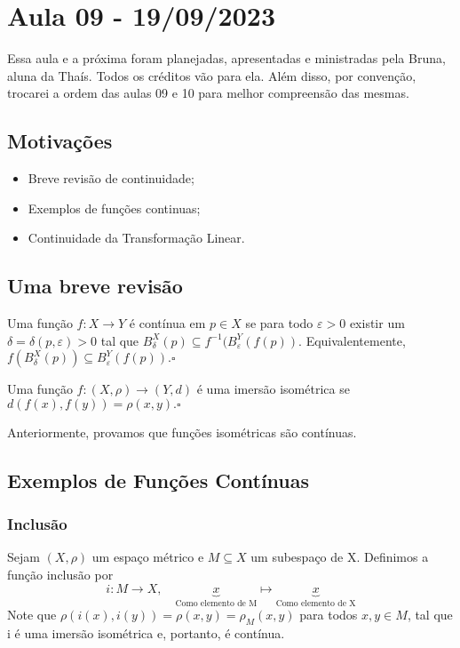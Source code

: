 \documentclass[MetricSpaces/metric_notes.tex]{subfiles}
\begin{document}
\section{Aula 09 - 19/09/2023}
Essa aula e a próxima foram planejadas, apresentadas e ministradas pela Bruna, aluna da Thaís. Todos os créditos vão para ela.
Além disso, por convenção, trocarei a ordem das aulas 09 e 10 para melhor compreensão das mesmas.
\subsection{Motivações}
\begin{itemize}
	\item Breve revisão de continuidade;
	\item Exemplos de funções continuas;
	\item Continuidade da Transformação Linear.
\end{itemize}
\subsection{Uma breve revisão}
\begin{def*}
	Uma função \(f:X\rightarrow Y\) é contínua em \(p\in X\) se para todo \(\varepsilon >0\) existir um
	\(\delta =\delta (p, \varepsilon)>0\) tal que \(B_{\delta }^{X}(p)\subseteq{f^{-1}(B_{\varepsilon }^{Y}(f(p))}.\)
	Equivalentemente, \(f(B_{\delta }^{X}(p))\subseteq{B_{\varepsilon }^{Y}(f(p))}.\square\)
\end{def*}
\begin{def*}
	Uma função \(f:(X, \rho )\rightarrow (Y, d)\) é uma imersão isométrica se \(d(f(x), f(y)) = \rho (x, y).\square\)
\end{def*}
Anteriormente, provamos que funções isométricas são contínuas.
\subsection{Exemplos de Funções Contínuas}
\subsubsection{Inclusão}
Sejam \((X, \rho )\) um espaço métrico e \(M\subseteq{X}\) um subespaço de X. Definimos a função inclusão por
\[
	i:M\rightarrow X,\quad \underbrace{x}_{\text{Como elemento de M}}\longmapsto \underbrace{x}_{\text{Como elemento de X}}
\]
Note que \(\rho (i(x), i(y)) = \rho (x, y) = \rho_{M}(x, y)\) para todos \(x, y\in M\), tal que i é uma imersão isométrica
e, portanto, é contínua.
\end{document}
